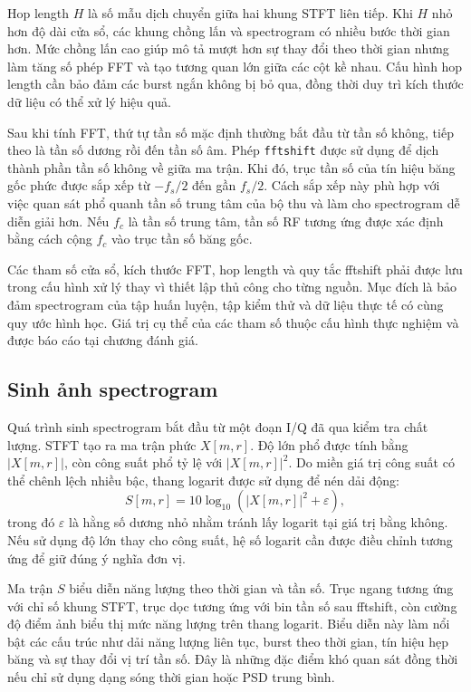 \documentclass[../DoAn.tex]{subfiles}
\begin{document}
Hop length $H$ là số mẫu dịch chuyển giữa hai khung STFT liên tiếp. Khi $H$ nhỏ hơn độ dài cửa sổ, các khung chồng lấn và spectrogram có nhiều bước thời gian hơn. Mức chồng lấn cao giúp mô tả mượt hơn sự thay đổi theo thời gian nhưng làm tăng số phép FFT và tạo tương quan lớn giữa các cột kề nhau. Cấu hình hop length cần bảo đảm các burst ngắn không bị bỏ qua, đồng thời duy trì kích thước dữ liệu có thể xử lý hiệu quả.

Sau khi tính FFT, thứ tự tần số mặc định thường bắt đầu từ tần số không, tiếp theo là tần số dương rồi đến tần số âm. Phép \texttt{fftshift} được sử dụng để dịch thành phần tần số không về giữa ma trận. Khi đó, trục tần số của tín hiệu băng gốc phức được sắp xếp từ $-f_s/2$ đến gần $f_s/2$. Cách sắp xếp này phù hợp với việc quan sát phổ quanh tần số trung tâm của bộ thu và làm cho spectrogram dễ diễn giải hơn. Nếu $f_c$ là tần số trung tâm, tần số RF tương ứng được xác định bằng cách cộng $f_c$ vào trục tần số băng gốc.

Các tham số cửa sổ, kích thước FFT, hop length và quy tắc fftshift phải được lưu trong cấu hình xử lý thay vì thiết lập thủ công cho từng nguồn. Mục đích là bảo đảm spectrogram của tập huấn luyện, tập kiểm thử và dữ liệu thực tế có cùng quy ước hình học. Giá trị cụ thể của các tham số thuộc cấu hình thực nghiệm và được báo cáo tại chương đánh giá.

\subsection{Sinh ảnh spectrogram}

Quá trình sinh spectrogram bắt đầu từ một đoạn I/Q đã qua kiểm tra chất lượng. STFT tạo ra ma trận phức $X[m,r]$. Độ lớn phổ được tính bằng $|X[m,r]|$, còn công suất phổ tỷ lệ với $|X[m,r]|^2$. Do miền giá trị công suất có thể chênh lệch nhiều bậc, thang logarit được sử dụng để nén dải động:
\begin{equation}
    S[m,r]
    =
    10\log_{10}
    \left(
        |X[m,r]|^2+\varepsilon
    \right),
\end{equation}
trong đó $\varepsilon$ là hằng số dương nhỏ nhằm tránh lấy logarit tại giá trị bằng không. Nếu sử dụng độ lớn thay cho công suất, hệ số logarit cần được điều chỉnh tương ứng để giữ đúng ý nghĩa đơn vị.

Ma trận $S$ biểu diễn năng lượng theo thời gian và tần số. Trục ngang tương ứng với chỉ số khung STFT, trục dọc tương ứng với bin tần số sau fftshift, còn cường độ điểm ảnh biểu thị mức năng lượng trên thang logarit. Biểu diễn này làm nổi bật các cấu trúc như dải năng lượng liên tục, burst theo thời gian, tín hiệu hẹp băng và sự thay đổi vị trí tần số. Đây là những đặc điểm khó quan sát đồng thời nếu chỉ sử dụng dạng sóng thời gian hoặc PSD trung bình.
\end{document}
